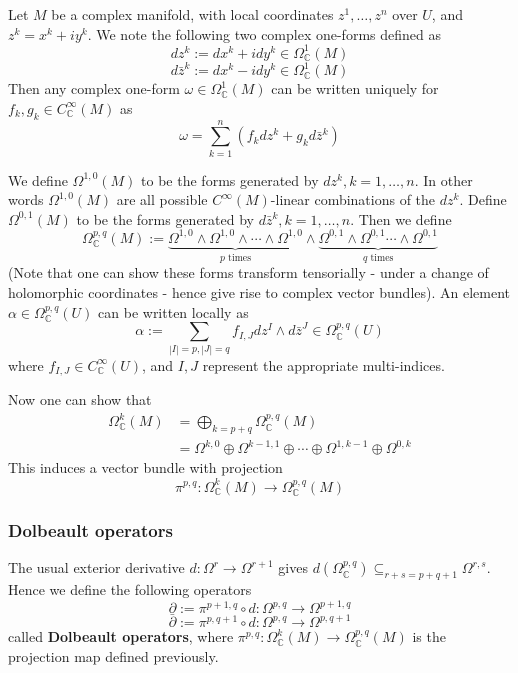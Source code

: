\documentclass[a4paper]{article}
\theoremstyle{definition} \newtheorem*{definition}{Definition}
\theoremstyle{definition} \newtheorem*{definitions}{Definitions}
\theoremstyle{plain} \newtheorem{theorem}{Theorem}[section]
\theoremstyle{plain} \newtheorem{proposition}[theorem]{Proposition}
\theoremstyle{plain} \newtheorem{corollary}[theorem]{Corollary}
\theoremstyle{plain} \newtheorem{lemma}[theorem]{Lemma}
\theoremstyle{plain} \newtheorem{example}[theorem]{Example}
\newcommand{\defn}[1]{\textbf{#1}}
\newcommand{\complexnos}{\mathbb{C}}
\newcommand{\smooth}{C^\infty}
\begin{document}
Let $M$ be a complex manifold, with local coordinates $z^1, \ldots, z^n$ over $U$, and $z^k=x^k+iy^k$. We note the following two complex one-forms defined as
$$dz^k := dx^k + i dy^k \in \Omega^1_\complexnos (M)$$
$$d\bar{z}^k := dx^k - i dy^k \in \Omega^1_\complexnos (M)$$
Then any complex one-form $\omega\in \Omega^1_\complexnos (M)$ can be written uniquely for $f_k, g_k \in C_\complexnos ^\infty(M)$ as 
$$\omega = \sum_{k=1}^n (f_kdz^k + g_kd\bar{z}^k)$$

We define $\Omega^{1, 0}(M)$ to be the forms generated by $dz^k, k=1, \ldots, n$. In other words $\Omega^{1, 0}(M)$ are all possible $\smooth(M)$-linear combinations of the $dz^k$. Define $\Omega^{0, 1}(M)$ to be the forms generated by $d\bar{z}^k, k=1, \ldots, n$. 
Then we define 
$$\Omega^{p, q}_\complexnos (M) := \underbrace{\Omega^{1, 0} \wedge \Omega^{1, 0} \wedge \cdots \wedge \Omega^{1, 0}}_{p \text{ times}} \wedge \underbrace{\Omega^{0, 1} \wedge \Omega^{0, 1} \cdots \wedge \Omega^{0, 1}}_{q \text{ times}}$$
(Note that one can show these forms transform tensorially - under a change of holomorphic coordinates - hence give rise to complex vector bundles). An element $\alpha\in \Omega^{p,q}_\complexnos(U)$ can be written locally as 
$$\alpha := \sum_{|I|=p, |J|=q} f_{I,J} dz^I \wedge d\bar{z}^J \in \Omega^{p,q}_\complexnos(U)$$
where $f_{I, J}\in \smooth_\complexnos(U)$, and $I, J$ represent the appropriate multi-indices. 

Now one can show that
\begin{align*}
\Omega^k_\complexnos(M) & =\bigoplus_{k=p+q} \Omega^{p, q}_\complexnos (M) \\
& = \Omega^{k, 0}\oplus\Omega^{k-1, 1}\oplus \cdots \oplus \Omega^{1, k-1}\oplus \Omega^{0, k}
\end{align*}
This induces a vector bundle with projection 
$$\pi^{p,q}:\Omega^k_\complexnos (M)\to \Omega^{p, q}_\complexnos(M)$$

\subsubsection{Dolbeault operators}
The usual exterior derivative $d:\Omega^r \to \Omega^{r+1}$ gives $d(\Omega^{p,q}_\complexnos)\subseteq_{r+s=p+q+1} \Omega^{r, s}$. Hence we define the following operators
$$\partial := \pi^{p+1, q}\circ d:\Omega^{p,q}\to \Omega^{p+1, q}$$
$$\bar{\partial} := \pi^{p, q+1}\circ d:\Omega^{p,q}\to \Omega^{p, q+1}$$
called \defn{Dolbeault operators}, where $\pi^{p, q}:\Omega^k_\complexnos (M)\to \Omega^{p, q}_\complexnos(M)$ is the projection map defined previously. 
\end{document}
